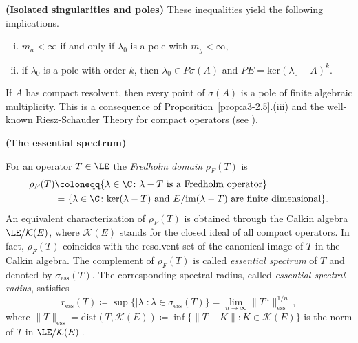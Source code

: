 \begin{example}{\textbf{(Isolated singularities and poles)}}
These inequalities yield the following implications.
\begin{enumerate}[(i)]
\item
$m_{a} < \infty$ if and only if $\lambda_{0}$ is a pole with $m_{g} < \infty$,
\item
if $\lambda_{0}$ is a pole with order $k$, then $\lambda_{0} \in P\sigma(A)$ and $PE = \text{ker}(\lambda_{0} - A)^{k}$.
\end{enumerate}
If $A$ has compact resolvent, then every point of $\sigma(A)$ is a pole of finite algebraic multiplicity.
This is a consequence of Proposition~\ref{prop:a3-2.5}.(iii) and the well-known Riesz-Schauder Theory for compact operators (see \citet[VII.4.5]{dunfordschwartz:1958}).
\end{example}
\begin{example}{\textbf{(The essential spectrum)}}
\label{subsec:a3-3.7}	

For an operator $T \in \LE$ the \emph{Fredholm domain} $\rho_{F}(T)$ is
\begin{equation}\label{eq:a3-3.5} 
\begin{aligned}
	\rho_{F}(T) & \coloneqq  \{\lambda \in \C \colon \lambda - T \text{ is a Fredholm operator}\}\\
	& =  \{\lambda \in \C \colon \text{ker}(\lambda - T) \text{ and } E/\text{im}(\lambda - T) \text{ are finite dimensional}\}.
\end{aligned}
\end{equation}
An equivalent characterization of $\rho_{F}(T)$ is obtained through the Calkin algebra $\LE/\mathcal{K}(E)$, where $\mathcal{K}(E)$ stands for the closed ideal of all compact operators.
In fact, $\rho_{F}(T)$ coincides with the resolvent set of the canonical image of $T$ in the Calkin algebra.
The complement of $\rho_{F}(T)$ is called \emph{essential spectrum} of $T$ and denoted by $\sigma_{\text{ess}}(T)$.
The corresponding spectral radius, called \emph{essential spectral radius}, satisfies
\begin{equation}\label{eq:a3-3.6}
r_{\text{ess}}(T) \coloneqq \sup \{|\lambda| \colon \lambda \in \sigma_{\text{ess}}(T)\} = \lim_{n \to \infty} \|T^{n}\|_{\text{ess}}^{1/n}\,,
\end{equation}
where $\|T\|_{\text{ess}} = \text{dist}(T,\mathcal{K}(E)) \coloneqq \inf \{\|T - K\| \colon K \in \mathcal{K}(E)\}$ is the norm of $T$ in $\LE/\mathcal{K}(E)$\,.


\end{example}
